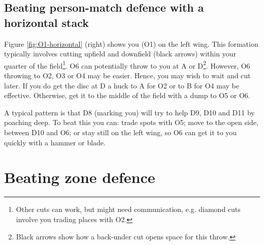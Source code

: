 \documentclass{tufte-handout}
\begin{document}
\subsection{Beating person-match defence with a horizontal stack}\label{sec:horizontall}
Figure \ref{fig:O1-horizontal} (right) shows 
you (O1) 
on the left wing. 
This formation 
typically involves cutting
upfield and downfield (black arrows)
within your quarter of the field\footnote{
Other cuts
can work, 
but might need
communication,
e.g. diamond cuts 
involve you trading places 
with O2.}. 
O6 
can potentially 
throw to you 
at A 
or D\footnote{
Black arrows
show how a back-under cut 
opens space 
for this throw.}. 
However, 
O6 throwing to 
O2, O3 or O4  
may be easier. 
Hence,  
you may wish to 
wait and 
cut later. 
If you do get the disc 
at D 
a huck to 
A for O2 or 
to B for O4 
may be effective.
Otherwise, 
get it to the middle of the field 
with a dump to O5 or O6. 

A typical pattern
is that D8 (marking you)
will try to help 
D9, D10 and D11 
by poaching deep.
To beat this 
you can: 
trade spots with O5;
move to the open side, 
between D10 and O6; or 
stay still 
on the left wing,
so O6 can 
get it to you 
quickly
with a hammer 
or blade.

\section{Beating zone defence}\label{sec:zone}
\end{document}
